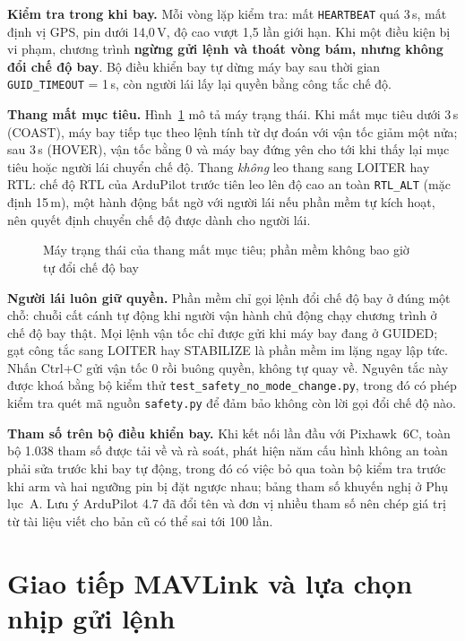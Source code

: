 \textbf{Kiểm tra trong khi bay.} Mỗi vòng lặp kiểm tra: mất \texttt{HEARTBEAT} quá 3\,s, mất định vị GPS, pin dưới 14,0\,V, độ cao vượt 1,5 lần giới hạn. Khi một điều kiện bị vi phạm, chương trình \textbf{ngừng gửi lệnh và thoát vòng bám, nhưng không đổi chế độ bay}. Bộ điều khiển bay tự dừng máy bay sau thời gian \texttt{GUID\_TIMEOUT} = 1\,s, còn người lái lấy lại quyền bằng công tắc chế độ.

\textbf{Thang mất mục tiêu.} Hình~\ref{fig:antoan} mô tả máy trạng thái. Khi mất mục tiêu dưới 3\,s (COAST), máy bay tiếp tục theo lệnh tính từ dự đoán với vận tốc giảm một nửa; sau 3\,s (HOVER), vận tốc bằng 0 và máy bay đứng yên cho tới khi thấy lại mục tiêu hoặc người lái chuyển chế độ. Thang \textit{không} leo thang sang LOITER hay RTL: chế độ RTL của ArduPilot trước tiên leo lên độ cao an toàn \texttt{RTL\_ALT} (mặc định 15\,m), một hành động bất ngờ với người lái nếu phần mềm tự kích hoạt, nên quyết định chuyển chế độ được dành cho người lái.

\begin{figure}[H]
\centering
\resizebox{0.75\textwidth}{!}{}
\caption{Máy trạng thái của thang mất mục tiêu; phần mềm không bao giờ tự đổi chế độ bay}
\label{fig:antoan}
\end{figure}

\textbf{Người lái luôn giữ quyền.} Phần mềm chỉ gọi lệnh đổi chế độ bay ở đúng một chỗ: chuỗi cất cánh tự động khi người vận hành chủ động chạy chương trình ở chế độ bay thật. Mọi lệnh vận tốc chỉ được gửi khi máy bay đang ở GUIDED; gạt công tắc sang LOITER hay STABILIZE là phần mềm im lặng ngay lập tức. Nhấn Ctrl+C gửi vận tốc 0 rồi buông quyền, không tự quay về. Nguyên tắc này được khoá bằng bộ kiểm thử \texttt{test\_safety\_no\_mode\_change.py}, trong đó có phép kiểm tra quét mã nguồn \texttt{safety.py} để đảm bảo không còn lời gọi đổi chế độ nào.

\textbf{Tham số trên bộ điều khiển bay.} Khi kết nối lần đầu với Pixhawk~6C, toàn bộ 1.038 tham số được tải về và rà soát, phát hiện năm cấu hình không an toàn phải sửa trước khi bay tự động, trong đó có việc bỏ qua toàn bộ kiểm tra trước khi arm và hai ngưỡng pin bị đặt ngược nhau; bảng tham số khuyến nghị ở Phụ lục~A. Lưu ý ArduPilot 4.7 đã đổi tên và đơn vị nhiều tham số nên chép giá trị từ tài liệu viết cho bản cũ có thể sai tới 100 lần.

\section{Giao tiếp MAVLink và lựa chọn nhịp gửi lệnh}

